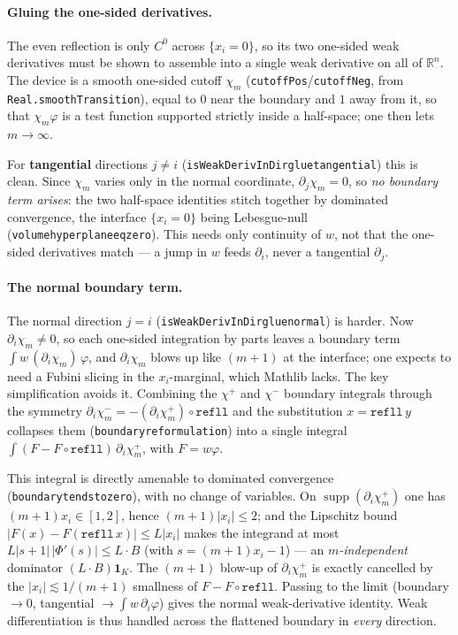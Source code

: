 ﻿\documentclass[12pt, a4paper]{article}
\renewcommand{\_}{\origunderscore\allowbreak}
\theoremstyle{definition}
\theoremstyle{plain}
\begin{document}
\paragraph{Gluing the one-sided derivatives.}  The even reflection is only $C^0$ across
$\{x_i=0\}$, so its two one-sided weak derivatives must be shown to assemble into a single weak
derivative on all of $\mathbb{R}^n$.  The device is a smooth one-sided cutoff $\chi_m$
(\texttt{cutoffPos}/\texttt{cutoffNeg}, from \texttt{Real.smoothTransition}), equal to $0$ near the
boundary and $1$ away from it, so that $\chi_m\varphi$ is a test function supported strictly inside a
half-space; one then lets $m\to\infty$.

For \textbf{tangential} directions $j\ne i$ (\texttt{isWeakDerivInDir\_glue\_tangential}) this is
clean.  Since $\chi_m$ varies only in the normal coordinate, $\partial_j\chi_m=0$, so \emph{no boundary
term arises}: the two half-space identities stitch together by dominated convergence, the interface
$\{x_i=0\}$ being Lebesgue-null (\texttt{volume\_hyperplane\_eq\_zero}).  This needs only continuity of
$w$, not that the one-sided derivatives match --- a jump in $w$ feeds $\partial_i$, never a tangential
$\partial_j$.

\paragraph{The normal boundary term.}  The normal direction $j=i$
(\texttt{isWeakDerivInDir\_glue\_normal}) is harder.  Now $\partial_i\chi_m\ne0$, so each one-sided
integration by parts leaves a boundary term $\int w\,(\partial_i\chi_m)\,\varphi$, and $\partial_i\chi_m$
blows up like $(m{+}1)$ at the interface; one expects to need a Fubini slicing in the $x_i$-marginal,
which Mathlib lacks.  The key simplification avoids it.  Combining the $\chi^+$ and $\chi^-$ boundary
integrals through the symmetry $\partial_i\chi^-_m=-(\partial_i\chi^+_m)\circ\texttt{refll}$ and the
substitution $x=\texttt{refll}\,y$ collapses them (\texttt{boundary\_reformulation}) into a single
integral $\int (F-F\circ\texttt{refll})\,\partial_i\chi^+_m$, with $F=w\varphi$.

This integral is directly amenable to dominated convergence (\texttt{boundary\_tendsto\_zero}), with no
change of variables.  On $\operatorname{supp}(\partial_i\chi^+_m)$ one has $(m{+}1)x_i\in[1,2]$, hence
$(m{+}1)\lvert x_i\rvert\le2$; and the Lipschitz bound
$\lvert F(x)-F(\texttt{refll}\,x)\rvert\le L\lvert x_i\rvert$ makes the integrand at most
$L\lvert s{+}1\rvert\,\lvert\Phi'(s)\rvert\le L\!\cdot\!B$ (with $s=(m{+}1)x_i-1$) --- an
\emph{$m$-independent} dominator $(L\!\cdot\!B)\mathbf 1_K$.  The $(m{+}1)$ blow-up of $\partial_i\chi^+_m$
is exactly cancelled by the $\lvert x_i\rvert\lesssim1/(m{+}1)$ smallness of $F-F\circ\texttt{refll}$.
Passing to the limit (boundary $\to0$, tangential $\to\int w\,\partial_i\varphi$) gives the normal
weak-derivative identity.  Weak differentiation is thus handled across the flattened boundary in
\emph{every} direction.
\end{document}
